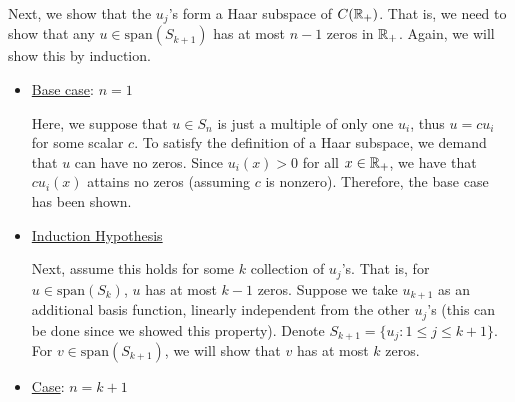 \begin{solution}
    Next, we show that the $u_j$'s form a Haar subspace of $C(\mathbb{R}_+)$. That is, we need to show that any $u \in \text{span} (S_{k+1})$ has at most $n-1$ zeros in $\mathbb{R}_+$. Again, we will show this by induction. 
    \begin{itemize}
        \item \underline{Base case}: $n = 1$

        \hop
        Here, we suppose that $u \in S_n$ is just a multiple of only one $u_i$, thus $u = cu_i$ for some scalar $c$. To satisfy the definition of a Haar subspace, we demand that $u$ can have no zeros. Since $u_i(x) > 0$ for all $x \in \mathbb{R}_+$, we have that $cu_i(x)$ attains no zeros (assuming $c$ is nonzero). Therefore, the base case has been shown.  

        \item \underline{Induction Hypothesis}

        \hop 
        Next, assume this holds for some $k$ collection of $u_j$'s. That is, for $u \in \text{span}(S_k)$, $u$ has at most $k-1$ zeros. Suppose we take $u_{k+1}$ as an additional basis function, linearly independent from the other $u_j$'s (this can be done since we showed this property). Denote $S_{k+1} = \{u_j : 1 \leq j \leq k+1\}$. For $v \in \text{span}(S_{k+1})$, we will show that $v$ has at most $k$ zeros.

        \item \underline{Case}: $n = k+1$


\end{itemize}
\end{solution}
